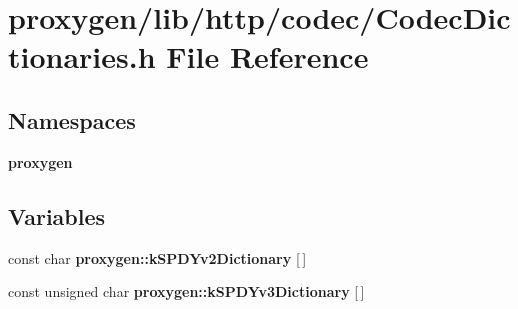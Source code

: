 \section{proxygen/lib/http/codec/\+Codec\+Dictionaries.h File Reference}
\label{CodecDictionaries_8h}
\subsection*{Namespaces}
\begin{DoxyCompactItemize}
\item 
 {\bf proxygen}
\end{DoxyCompactItemize}
\subsection*{Variables}
\begin{DoxyCompactItemize}
\item 
const char {\bf proxygen\+::k\+S\+P\+D\+Yv2\+Dictionary} [$\,$]
\item 
const unsigned char {\bf proxygen\+::k\+S\+P\+D\+Yv3\+Dictionary} [$\,$]
\end{DoxyCompactItemize}
